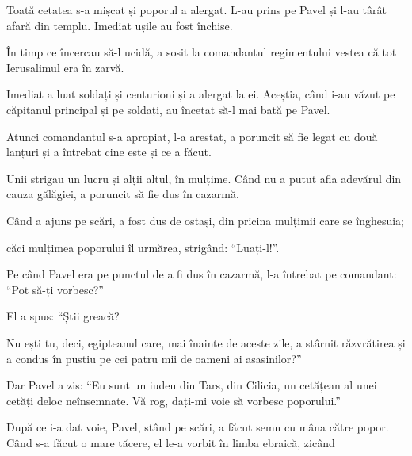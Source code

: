 {\par }{\PP {}Toată cetatea s-a mișcat și poporul a alergat. L-au prins pe Pavel și l-au târât afară din templu. Imediat ușile au fost închise.

În timp ce încercau să-l ucidă, a sosit la comandantul regimentului vestea că tot Ierusalimul era în zarvă.

Imediat a luat soldați și centurioni și a alergat la ei. Aceștia, când i-au văzut pe căpitanul principal și pe soldați, au încetat să-l mai bată pe Pavel.

Atunci comandantul s-a apropiat, l-a arestat, a poruncit să fie legat cu două lanțuri și a întrebat cine este și ce a făcut.

Unii strigau un lucru și alții altul, în mulțime. Când nu a putut afla adevărul din cauza gălăgiei, a poruncit să fie dus în cazarmă.


\par }{\PP {}Când a ajuns pe scări, a fost dus de ostași, din pricina mulțimii care se înghesuia;

căci mulțimea poporului îl urmărea, strigând: “Luați-l!”.

Pe când Pavel era pe punctul de a fi dus în cazarmă, l-a întrebat pe comandant: “Pot să-ți vorbesc?”

\par }{\PP El a spus: “Știi greacă?

Nu ești tu, deci, egipteanul care, mai înainte de aceste zile, a stârnit răzvrătirea și a condus în pustiu pe cei patru mii de oameni ai asasinilor?”


\par }{\PP {}Dar Pavel a zis: “Eu sunt un iudeu din Tars, din Cilicia, un cetățean al unei cetăți deloc neînsemnate. Vă rog, dați-mi voie să vorbesc poporului.”


\par }{\PP {}După ce i-a dat voie, Pavel, stând pe scări, a făcut semn cu mâna către popor. Când s-a făcut o mare tăcere, el le-a vorbit în limba ebraică, zicând



\par }
